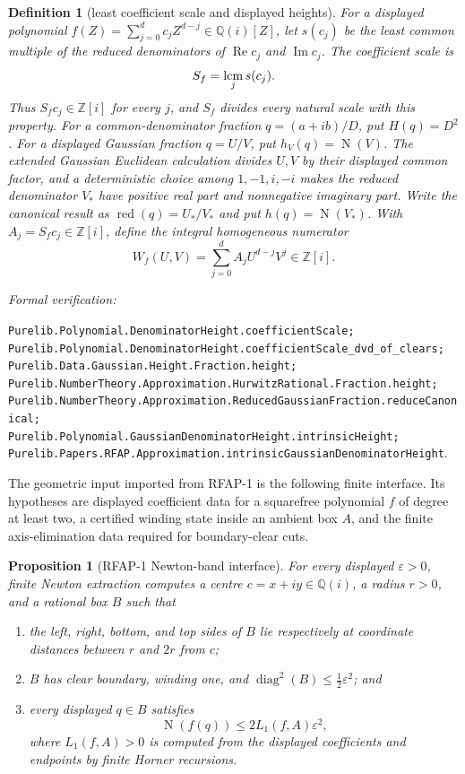 \documentclass[11pt]{article}
\newtheorem{proposition}[proposition]{Proposition}
\newtheorem{definition}[definition]{Definition}
\newcommand{\Qi}{\mathbb{Q}(i)}
\newcommand{\Zi}{\mathbb{Z}[i]}
\newcommand{\Norm}[1]{\operatorname{N}\!\left(#1\right)}
\newcommand{\Ree}{\operatorname{Re}}
\newcommand{\Imm}{\operatorname{Im}}
\newcommand{\diamq}{\operatorname{diag}^{2}}
\newcommand{\eps}{\varepsilon}
\newcommand{\leanref}[1]{\par\smallskip\noindent
  \emph{Formal verification:}\par\nobreak
  {\raggedright\nolinkurl{#1}.\par}}
\begin{document}
\begin{definition}[least coefficient scale and displayed heights]
\label{def:intro-height}
For a displayed polynomial
$f(Z)=\sum_{j=0}^{d}c_jZ^{d-j}\in\Qi[Z]$, let $s(c_j)$ be the least common
multiple of the reduced denominators of $\Ree c_j$ and $\Imm c_j$.  The
\emph{coefficient scale} is
\[
                         S_f=\mathop{\rm lcm}_j s(c_j).
\]
Thus $S_fc_j\in\Zi$ for every $j$, and $S_f$ divides every natural scale
with this property.  For a common-denominator fraction $q=(a+ib)/D$, put
$H(q)=D^2$.  For a displayed Gaussian fraction $q=U/V$, put
$h_V(q)=\Norm V$.  The extended Gaussian Euclidean calculation divides
$U,V$ by their displayed common factor, and a deterministic choice among
$1,-1,i,-i$ makes the reduced denominator $V_*$ have positive real part and
nonnegative imaginary part.  Write the canonical result as
$\operatorname{red}(q)=U_*/V_*$ and put $h(q)=\Norm{V_*}$.  With
$A_j=S_fc_j\in\Zi$, define the integral homogeneous numerator
\[
             W_f(U,V)=\sum_{j=0}^{d}A_jU^{d-j}V^j\in\Zi.
\]
\end{definition}

\leanref{Purelib.Polynomial.DenominatorHeight.coefficientScale;
Purelib.Polynomial.DenominatorHeight.coefficientScale_dvd_of_clears;
Purelib.Data.Gaussian.Height.Fraction.height;
Purelib.NumberTheory.Approximation.HurwitzRational.Fraction.height;
Purelib.NumberTheory.Approximation.ReducedGaussianFraction.reduceCanonical;
Purelib.Polynomial.GaussianDenominatorHeight.intrinsicHeight;
Purelib.Papers.RFAP.Approximation.intrinsicGaussianDenominatorHeight}

The geometric input imported from RFAP-1 is the following finite interface.
Its hypotheses are displayed coefficient data for a squarefree polynomial
$f$ of degree at least two, a certified winding state inside an ambient box
$A$, and the finite axis-elimination data required for boundary-clear cuts.

\begin{proposition}[RFAP-1 Newton-band interface]
\label{prop:rfap-input}
For every displayed $\eps>0$, finite Newton extraction computes a centre
$c=x+iy\in\Qi$, a radius $r>0$, and a rational box $B$ such that
\begin{enumerate}[label=(\roman*)]
\item the left, right, bottom, and top sides of $B$ lie respectively at
coordinate distances between $r$ and $2r$ from $c$;
\item $B$ has clear boundary, winding one, and
$\diamq(B)\le\tfrac12\eps^2$; and
\item every displayed $q\in B$ satisfies
\begin{equation}
\label{eq:box-residual}
                \Norm{f(q)}\le2L_1(f,A)\eps^2,
\end{equation}
where $L_1(f,A)>0$ is computed from the displayed coefficients and endpoints
by finite Horner recursions.
\end{enumerate}
\end{proposition}
\end{document}
